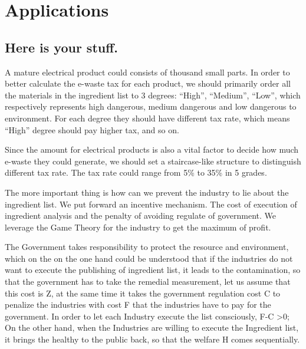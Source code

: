 \section{Applications}

\subsection{Here is your stuff.}
A mature electrical product could consists of thousand small parts. In order to better calculate the e-waste tax for each product, we should primarily order all the materials in the ingredient list to 
3 degrees: ``High'', ``Medium'', ``Low'', which respectively represents high dangerous, medium dangerous and low dangerous to environment. For each degree they
should have different tax rate, which means ``High'' degree should pay higher tax, and so on.

Since the amount for electrical products is also a vital factor to decide how much e-waste they could generate, we should set a staircase-like structure to distinguish different tax rate.  The tax rate
could range from 5\% to 35\% in 5 grades. 


The more important thing is how can we prevent the industry to lie about the ingredient list. We put forward an incentive mechanism. The cost of execution of ingredient analysis and the penalty 
of avoiding regulate of government. We leverage the Game Theory for the industry to get the maximum of profit.

The Government takes responsibility to protect the resource and environment, which on the on the one hand could be understood that if the industries do not want to execute the publishing of ingredient list,
it leads to the contamination, so that the government has to take the remedial measurement, let us assume that this cost is Z, at the same time it takes the government regulation cost C to penalize the
industries with cost F that the industries have to pay for the government. In order to let each Industry execute the list consciously, F-C >0; On the other hand, when the Industries are willing to execute the
Ingredient list, it brings the healthy to the public back, so that the welfare H comes sequentially.

